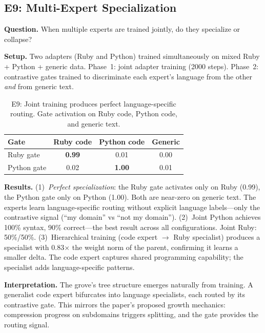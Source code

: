 \documentclass{article}
\begin{document}
\subsection{E9: Multi-Expert Specialization}
\label{sec:e9}

\textbf{Question.} When multiple experts are trained jointly, do they
specialize or collapse?

\textbf{Setup.} Two adapters (Ruby and Python) trained simultaneously on
mixed Ruby + Python + generic data. Phase~1: joint adapter training (2000
steps). Phase~2: contrastive gates trained to discriminate each expert's
language from the other \emph{and} from generic text.

\begin{table}[h]
\centering
\caption{E9: Joint training produces perfect language-specific routing.
Gate activation on Ruby code, Python code, and generic text.}
\label{tab:e9-gates}
\begin{tabular}{@{}lccc@{}}
\toprule
Gate & Ruby code & Python code & Generic \\
\midrule
Ruby gate & \textbf{0.99} & 0.01 & 0.00 \\
Python gate & 0.02 & \textbf{1.00} & 0.01 \\
\bottomrule
\end{tabular}
\end{table}

\textbf{Results.} (1)~\emph{Perfect specialization}: the Ruby gate activates
only on Ruby (0.99), the Python gate only on Python (1.00). Both are
near-zero on generic text. The experts learn language-specific routing
without explicit language labels---only the contrastive signal (``my
domain'' vs ``not my domain'').
(2)~Joint Python achieves 100\% syntax, 90\% correct---the best result
across all configurations. Joint Ruby: 50\%/50\%.
(3)~Hierarchical training (code expert $\to$ Ruby specialist) produces a
specialist with 0.83$\times$ the weight norm of the parent, confirming it
learns a smaller delta. The code expert captures shared programming
capability; the specialist adds language-specific patterns.

\textbf{Interpretation.} The grove's tree structure emerges naturally from
training. A generalist code expert bifurcates into language specialists,
each routed by its contrastive gate. This mirrors the paper's proposed
growth mechanics: compression progress on subdomains triggers splitting,
and the gate provides the routing signal.

\end{document}

